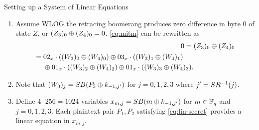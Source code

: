 \documentclass[notheorems]{beamer}
\theoremstyle{definition}
\theoremstyle{example}
\begin{document}
    \begin{frame}[<+->]{Setting up a System of Linear Equations}
        \begin{enumerate}
            \item Assume WLOG the retracing boomerang produces zero difference
            in byte 0 of state \(Z\), or \((Z_3)_0 \oplus (Z_4)_0 =
            0\). \eqref{eq:mitm} can be rewritten as
            \begin{align}
                0 ={}&(Z_3)_0 \oplus (Z_4)_0 \\
                \begin{split}
                    ={}& 02_x \cdot ((W_3)_0 \oplus (W_4)_0) \oplus 03_x \cdot ((W_3)_1 \oplus (W_4)_1) \\
                    &\oplus 01_x \cdot ((W_3)_2 \oplus (W_4)_2) \oplus 01_x \cdot ((W_3)_3 \oplus (W_4)_3).
                \end{split}
                \label{eq:lin-secret}
            \end{align}
            \item Note that \((W_3)_j = SB(P_3 \oplus k_{-1,
            j^\prime})\) for \(j = 0, 1, 2, 3\) where \(j^\prime =
            SR^{-1}(j)\).
            \item Define \(4 \cdot 256 = 1024\) variables \(x_{m,j} = SB(m
            \oplus k_{-1, j^\prime})\) for \(m \in \mathbb F_q\) and \(j = 0, 1, 2,
            3\). Each plaintext pair \(P_1, P_2\) satisfying
            \eqref{eq:lin-secret} provides a linear equation in \(x_{m,j}\).
            \seti
        \end{enumerate}    
    \end{frame}
\end{document}
